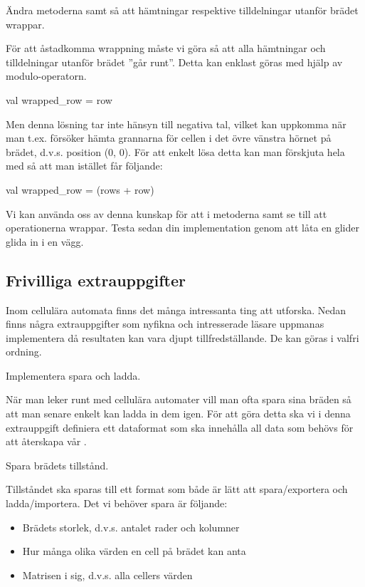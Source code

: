 \Subtask Ändra metoderna  samt  så att hämtningar respektive tilldelningar utanför brädet wrappar.

För att åstadkomma wrappning måste vi göra så att alla hämtningar och tilldelningar utanför brädet ''går runt''. Detta kan enklast göras med hjälp av modulo-operatorn.

\begin{Code}
val wrapped_row = row %
\end{Code}

Men denna lösning tar inte hänsyn till negativa tal, vilket kan uppkomma när man t.ex. försöker hämta grannarna för cellen i det övre vänstra hörnet på brädet, d.v.s. position (0, 0). För att enkelt lösa detta kan man förskjuta hela  med  så att man istället får följande:

\begin{Code}
val wrapped_row = (rows + row) %
\end{Code}

Vi kan använda oss av denna kunskap för att i metoderna  samt  se till att operationerna wrappar. Testa sedan din implementation genom att låta en glider glida in i en vägg.


\subsection{Frivilliga extrauppgifter}

Inom cellulära automata finns det många intressanta ting att utforska. Nedan finns några extrauppgifter som nyfikna och intresserade läsare uppmanas implementera då resultaten kan vara djupt tillfredställande. De kan göras i valfri ordning.


\Task Implementera spara och ladda.

När man leker runt med cellulära automater vill man ofta spara sina bräden så att man senare enkelt kan ladda in dem igen. För att göra detta ska vi i denna extrauppgift definiera ett dataformat som ska innehålla all data som behövs för att återskapa vår .

\Subtask Spara brädets tillstånd.

Tillståndet ska sparas till ett format som både är lätt att spara/exportera och ladda/importera. Det vi behöver spara är följande:

\begin{itemize}
	\item Brädets storlek, d.v.s. antalet rader och kolumner
	\item Hur många olika värden en cell på brädet kan anta
	\item Matrisen i sig, d.v.s. alla cellers värden
\end{itemize}


